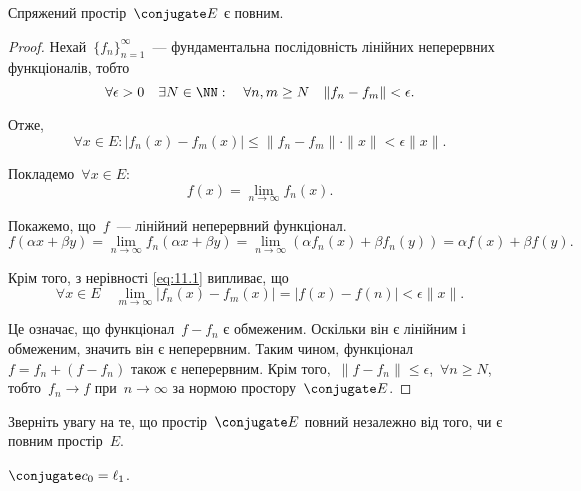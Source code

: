 \begin{theorem}
    Спряжений простір~$\conjugate E$ є повним.
\end{theorem}

\begin{proof}
    Нехай~$\{f_n\}_{n = 1}^\infty$~--- фундаментальна послідовність лінійних неперервних функціоналів, тобто
    \begin{equation*}
        \forall \epsilon > 0 \quad \exists N \in \NN: \quad \forall n, m \ge N \quad \|f_n - f_m\| < \epsilon.
    \end{equation*}

    Отже,
    \begin{equation}
        \label{eq:11.1}
        \forall x \in E: |f_n(x) - f_m(x)| \le \|f_n - f_m\| \cdot \|x\| < \epsilon \|x\|.
    \end{equation}
    
    Покладемо~$\forall x \in E$:
    \begin{equation*}
        f(x) = \lim_{n \to \infty} f_n(x).
    \end{equation*}
    
    Покажемо, що~$f$~--- лінійний неперервний функціонал.
    \begin{equation*}
        f(\alpha x + \beta y) =
        \lim_{n \to \infty} f_n(\alpha x + \beta y) =
        \lim_{n \to \infty} ( \alpha f_n(x) + \beta f_n(y)) =
        \alpha f(x) + \beta f(y).
    \end{equation*}
    
    Крім того, з нерівності \eqref{eq:11.1} випливає, що
    \begin{equation*}
        \forall x \in E \quad \lim_{m \to \infty} |f_n(x) - f_m(x)| = |f(x) - f(n)| < \epsilon \|x\|.
    \end{equation*}

    Це означає, що функціонал~$f - f_n$ є обмеженим. Оскільки він є лінійним і обмеженим, значить він є неперервним. Таким чином, функціонал~$f = f_n + (f - f_n)$ також є неперервним. Крім того,~$\|f - f_n\| \le \epsilon$,~$\forall n \ge N$, тобто~$f_n \to f$ при~$n \to \infty$ за нормою простору~$\conjugate E$. 
\end{proof}

\begin{remark}
    Зверніть увагу на те, що простір~$\conjugate E$ повний незалежно від того, чи є повним простір~$E$.
\end{remark}

\begin{example}
    $\conjugate c_0 = \ell_1$.
\end{example}


